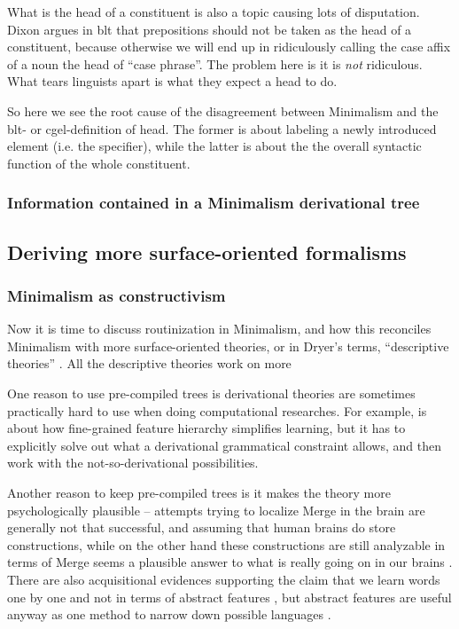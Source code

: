 \documentclass[../main.tex]{subfiles}
\begin{document}
What is the head of a constituent is also a topic causing lots of disputation. 
Dixon argues in \ac{blt} that prepositions should not be taken as the head of a constituent,
because otherwise we will end up in ridiculously calling the case affix of a noun the head of ``case phrase''.
The problem here is it is \emph{not} ridiculous.
What tears linguists apart is what they expect a head to do. %

So here we see the root cause of the disagreement between Minimalism and the \ac{blt}- or \ac{cgel}-definition 
of head. The former is about labeling a newly introduced element (i.e. the specifier), while the latter is about 
the the overall syntactic function of the whole constituent. 

\subsubsection{Information contained in a Minimalism derivational tree}


\subsection{Deriving more surface-oriented formalisms}

\subsubsection{Minimalism as constructivism}\label{sec:routine}

Now it is time to discuss routinization in Minimalism, and how this reconciles Minimalism with more 
surface-oriented theories, or in Dryer's terms, ``descriptive theories'' \citep{dryer2006descriptive}.
All the descriptive theories work on more %

One reason to use pre-compiled trees is derivational theories are sometimes 
practically hard to use when doing computational researches. For example, \citet{liter2020modeling}
is about how fine-grained feature hierarchy simplifies learning, but it has to explicitly solve out what 
a derivational grammatical constraint allows, and then work with the not-so-derivational possibilities.

Another reason to keep pre-compiled trees is it makes the theory more psychologically plausible --
attempts trying to localize Merge in the brain are generally not that successful, and assuming that 
human brains do store constructions, while on the other hand these constructions are still analyzable 
in terms of Merge seems a plausible answer to what is really going on in our brains
\citep{brain-syntax-1,brain-syntax-2}. There are also acquisitional evidences supporting the claim 
that we learn words one by one and not in terms of abstract features \citep{white2022lexicalization},
but abstract features are useful anyway as one method to narrow down possible languages \citep{liter2020modeling}.
\end{document}
